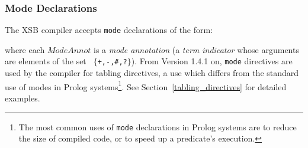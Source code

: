 \subsubsection{Mode Declarations}\label{mode_declarations}

The XSB compiler accepts {\tt mode} declarations of the form:


\noindent
where each $ModeAnnot$ is a {\em mode annotation\/} (a {\em term
indicator\/} whose arguments are elements of the set {\tt
$\{$+,-,\#,?$\}$}).  From Version 1.4.1 on, {\tt mode} directives are
used by the compiler for tabling directives, a use which differs from
the standard use of modes in Prolog systems\footnote{The most common
uses of {\tt mode} declarations in Prolog systems are to reduce the
size of compiled code, or to speed up a predicate's execution.}.  See
Section~\ref{tabling_directives} for detailed examples.

